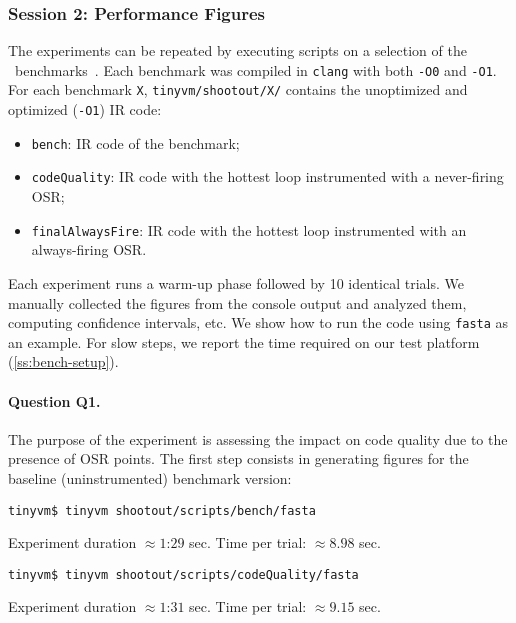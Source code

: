 
\subsubsection{Session 2: Performance Figures}

The experiments can be repeated by executing scripts on a selection of the \shootout\ benchmarks~\cite{shootout}. Each benchmark was compiled in {\tt clang} with both {\tt -O0} and {\tt -O1}. For each benchmark {\tt X}, {\tt tinyvm/shootout/X/} contains the unoptimized and optimized ({\tt -O1}) IR code:

\begin{itemize}[parsep=0pt]
\item {\tt bench}: IR code of the benchmark;
\item {\tt codeQuality}: IR code with the hottest loop instrumented with a never-firing OSR;
\item {\tt finalAlwaysFire}: IR code with the hottest loop instrumented with an always-firing OSR.
\end{itemize}

\noindent Each experiment runs a warm-up phase followed by 10 identical trials. We manually collected the figures from the console output and analyzed them, computing confidence intervals, etc. We show how to run the code using {\tt fasta} as an example. For slow steps, we report the time required on our test platform (\mysection\ref{ss:bench-setup}).

\paragraph{Question Q1.} The purpose of the experiment is assessing the impact on code quality due to the presence of OSR points.
The first step consists in generating figures for the baseline (uninstrumented) benchmark version:
\begin{small}
\begin{verbatim}
tinyvm$ tinyvm shootout/scripts/bench/fasta
\end{verbatim}
\end{small}

\noindent Experiment duration $\approx1$:$29$ sec. Time per trial: $\approx8.98$ sec.

\begin{small}
\begin{verbatim}
tinyvm$ tinyvm shootout/scripts/codeQuality/fasta
\end{verbatim}
\end{small}

\noindent Experiment duration $\approx1$:$31$ sec. Time per trial: $\approx9.15$ sec.


